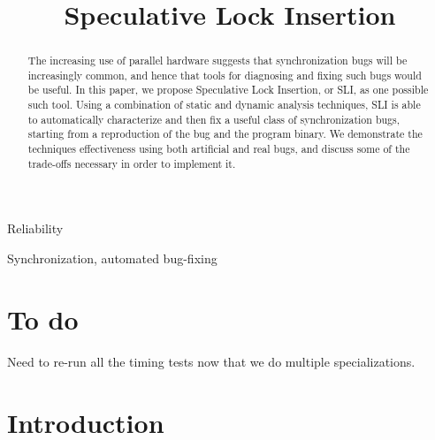 \documentclass[10pt,twocolumn,preprint,natbib,authoryear]{sigplanconf}
\begin{document}
\copyrightdata{[to be supplied]} 


\title{Speculative Lock Insertion}

\authorinfo{}{}{}

\maketitle

\begin{abstract}

The increasing use of parallel hardware suggests that synchronization
bugs will be increasingly common, and hence that tools for diagnosing
and fixing such bugs would be useful.  In this paper, we propose
Speculative Lock Insertion, or SLI, as one possible such tool.  Using
a combination of static and dynamic analysis techniques, SLI is able
to automatically characterize and then fix a useful class of
synchronization bugs, starting from a reproduction of the bug and the
program binary.  We demonstrate the techniques effectiveness using
both artificial and real bugs, and discuss some of the trade-offs
necessary in order to implement it.

\end{abstract}


\terms
Reliability

\keywords
Synchronization, automated bug-fixing

\section{To do}

Need to re-run all the timing tests now that we do multiple
specializations.

\section{Introduction}
\end{document}
